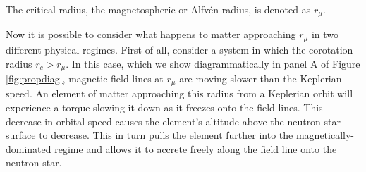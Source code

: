 The critical radius, the magnetospheric or Alfv\'en radius, is denoted as $r_\mu$.
\par Now it is possible to consider what happens to matter approaching $r_\mu$ in two different physical regimes.  First of all, consider a system in which the corotation radius $r_c>r_\mu$.  In this case, which we show diagrammatically in panel A of Figure \ref{fig:propdiag}, magnetic field lines at $r_\mu$ are moving slower than the Keplerian speed.  An element of matter approaching this radius from a Keplerian orbit will experience a torque slowing it down as it freezes onto the field lines.  This decrease in orbital speed causes the element's altitude above the neutron star surface to decrease.  This in turn pulls the element further into the magnetically-dominated regime and allows it to accrete freely along the field line onto the neutron star.

